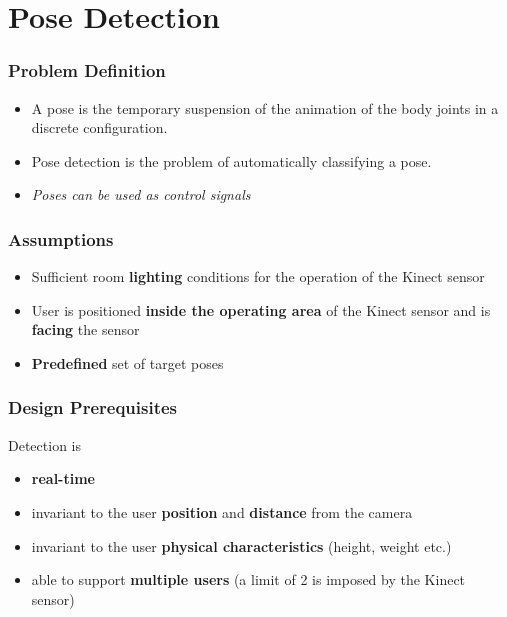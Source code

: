 \section{Pose Detection}


\begin{frame}
\frametitle{Problem Definition}

\begin{itemize}
\item A pose is the temporary suspension of the animation of the body joints in a discrete configuration.
\item Pose detection is the problem of automatically classifying a pose.
\item \textit{Poses can be used as control signals}
\end{itemize}
\end{frame}


\begin{frame}
\frametitle{Assumptions}

\begin{itemize}
\item Sufficient room \textbf{lighting} conditions for the operation of the Kinect sensor
\item User is positioned \textbf{inside the operating area} of the Kinect sensor and is \textbf{facing} the sensor
\item \textbf{Predefined} set of target poses
\end{itemize}

\end{frame}

\begin{frame}
\frametitle{Design Prerequisites}

Detection is

\begin{itemize}
\item \textbf{real-time}
\item invariant to the user \textbf{position} and \textbf{distance} from the camera
\item invariant to the user \textbf{physical characteristics} (height, weight etc.)
\item able to support \textbf{multiple users} (a limit of 2 is imposed by the Kinect sensor)
\end{itemize}

\end{frame}

